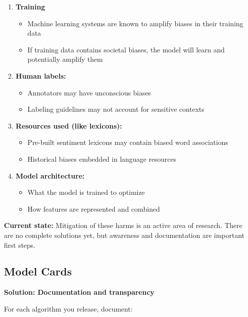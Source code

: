 \documentclass[11pt,a4paper]{article}
\theoremstyle{definition}
\theoremstyle{plain}
\theoremstyle{remark}
\begin{document}
\begin{enumerate}
    \item \textbf{Training }
    \begin{itemize}
        \item Machine learning systems are known to amplify biases in their training data
        \item If training data contains societal biases, the model will learn and potentially amplify them
    \end{itemize}
    
    \item \textbf{Human labels:}
    \begin{itemize}
        \item Annotators may have unconscious biases
        \item Labeling guidelines may not account for sensitive contexts
    \end{itemize}
    
    \item \textbf{Resources used (like lexicons):}
    \begin{itemize}
        \item Pre-built sentiment lexicons may contain biased word associations
        \item Historical biases embedded in language resources
    \end{itemize}
    
    \item \textbf{Model architecture:}
    \begin{itemize}
        \item What the model is trained to optimize
        \item How features are represented and combined
    \end{itemize}
\end{enumerate}

\textbf{Current state:}
Mitigation of these harms is an active area of research. There are no complete solutions yet, but awareness and documentation are important first steps.

\subsection{Model Cards}

\textbf{Solution: Documentation and transparency}

For each algorithm you release, document:
\end{document}
